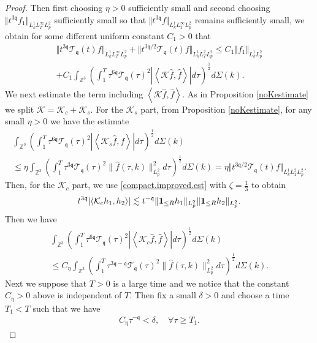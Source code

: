 \documentclass[reqno]{amsart}
\newcommand{\pv}{p}
\def\norm#1{\big\Vert#1\big\Vert}
\newcommand{\irnp}[2]{\left\langle {#1},{#2} \right\rangle}
\newcommand{\qq}{\mathfrak{q}}
\newcommand{\tTq}{t^{3\qq}}
\newcommand{\compK}{\mathcal{K}}
\newcommand{\ind}{{\bf 1}}
\newcommand{\Z}{\mathbb{Z}}
\newcommand{\spr}{\zeta}
\newcommand{\tw}{\mathcal{T}_{\qq}}
\theoremstyle{definition}
\numberwithin{equation}{section}
\numberwithin{theorem}{section}
\begin{document}
\begin{proof}
Then first choosing $\eta>0$ sufficiently small and second choosing $\Vert \tTq{f_1}\Vert_{L^1_kL^\infty_TL^2_{\pv}}$ sufficiently small so that $\Vert \tTq{f}\Vert_{L^1_kL^\infty_TL^2_{\pv}}$ remains sufficiently small, we obtain for some different uniform constant $C_1>0$ that 
\begin{multline}\label{estimated.nonlin}
        {\Vert{\tTq \tw(t) f}\Vert_{L^1_kL^\infty_TL^2_{\pv}}}
+
{\norm{t^{3\qq/2} \tw(t) f}_{L^1_kL^2_TL^2_{\pv}}}
\leq C_1
\norm{ {f}_1}_{L^1_kL^2_{\pv}}
\\
+ C_1
\int_{\Z^3} 
\left(\int^T_1 \tau^{6\qq} \tw(\tau)^2 \left|\irnp{\compK\hat{f}}{\hat{f}}\right|
d\tau \right)^{\frac12}
d\Sigma(k).
\end{multline}
We next estimate the term including $\irnp{\compK\hat{f}}{\hat{f}}$.   As in Proposition \ref{noKestimate} we split $\compK = \compK_c + \compK_s$.  For the $\compK_s$ part, from Proposition \ref{noKestimate}, for any small $\eta>0$ we have the estimate 
\begin{multline*}
    \int_{\Z^3} 
\left(\int^T_1 \tau^{6\qq} \tw(\tau)^2 \left|\irnp{\compK_s\hat{f}}{\hat{f}}\right|
d\tau \right)^{\frac12}
d\Sigma(k)
\\
\leq \eta
    \int_{\Z^3} 
\left(\int^T_1 \tau^{3\qq} \tw(\tau)^2  \|  \hat{f}(\tau,k )\|_{L^2_p}^2
d\tau \right)^{\frac12}
d\Sigma(k)
=
\eta {\norm{t^{3\qq/2} \tw(t) f}_{L^1_kL^2_TL^2_{\pv}}}.
\end{multline*}
Then, for the $\compK_c$ part, we use \eqref{compact.improved.est} with $\spr =\frac13$ to obtain
\begin{align}\notag 
    \tTq |\langle  \compK_c h_1, h_2\rangle |
\lesssim t^{-\qq} \|\ind_{\le R} h_1 \|_{L^2_p} \| \ind_{\le R} h_2 \|_{L^2_p}.
\end{align}
Then we have 
\begin{multline*}
    \int_{\Z^3} 
\left(\int^T_1 \tau^{6\qq} \tw(\tau)^2 \left|\irnp{\compK_c\hat{f}}{\hat{f}}\right|
d\tau \right)^{\frac12}
d\Sigma(k)
\\
\leq C_{\eta}
    \int_{\Z^3} 
\left(\int^T_1 \tau^{3\qq-\qq} \tw(\tau)^2  \|  \hat{f}(\tau,k )\|_{L^2_p}^2
d\tau \right)^{\frac12}
d\Sigma(k).
\end{multline*}
Next we suppose that $T>0$ is a large time and we notice that the constant $C_{\eta}>0$ above is independent of $T$.  Then  fix a small $\delta>0$ and choose a time $T_1 < T$ such that we have
\begin{align*}
    C_{\eta} \tau^{-\qq}< \delta, \quad \forall \tau \geq T_1.
\end{align*}

\end{proof}
\end{document}
